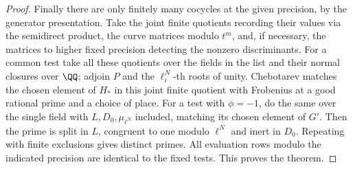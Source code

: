 \documentclass[a4paper,11pt]{article}
\theoremstyle{definition}
\theoremstyle{remark}
\numberwithin{equation}{section}
\begin{document}
\begin{proof}
Finally there are only finitely many cocycles at the
given precision, by the generator presentation. Take
the joint finite quotients recording their values via
the semidirect product, the curve matrices modulo
\(t^m\), and, if necessary, the matrices to higher fixed
precision detecting the nonzero discriminants.
For a common test take all these quotients over the
fields in the list and their normal closures over
\(\QQ\); adjoin \(P\) and the \(\ell_i^N\)-th roots
of unity. Chebotarev matches the chosen element of
\(H_*\) in this joint finite quotient with Frobenius at
a good rational prime and a choice of place. For a test
with \(\phi=-1\), do the same over the single field
with \(L,D_0,\mu_{\ell^N}\) included, matching its chosen
element of \(G'\). Then the prime is split in \(L\),
congruent to one modulo \(\ell^N\) and inert in \(D_0\).
Repeating with finite exclusions gives distinct primes.
All evaluation rows modulo the indicated precision are
identical to the fixed tests. This proves the theorem.
\end{proof}
\end{document}
